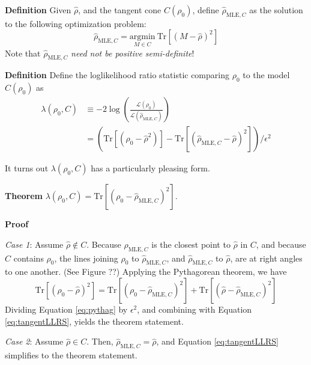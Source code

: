 \documentclass[aps,pra, twocolumn]{revtex4-1}
\newcommand{\rhohat}{\hat{\rho}}
\begin{document}
\textbf{Definition} Given $\hat{\rho}$, and the tangent cone $C(\rho_{0})$, define $\hat{\rho}_{\mathrm{MLE}, C}$ as the solution to the following optimization problem:
\begin{equation}
\hat{\rho}_{\mathrm{MLE}, C} = \underset{M \in C}{\text{argmin}}~\mathrm{Tr}[(M - \rhohat)^{2}]
\end{equation}
Note that $\hat{\rho}_{\mathrm{MLE}, C}$ \emph{need not be positive semi-definite}!

\textbf{Definition} Define the loglikelihood ratio statistic comparing $\rho_{0}$ to the model $C(\rho_{0})$ as 
\begin{align}
\nonumber\lambda(\rho_{0}, C) &\equiv -2 \log \left(\frac{\mathcal{L}(\rho_{0})}{\mathcal{L}(\hat{\rho}_{\mathrm{MLE}, C})}\right)\\
\label{eq:tangentLLRS}
& = (\mathrm{Tr}[(\rho_{0} - \rhohat^{2})] - \mathrm{Tr}[(\hat{\rho}_{\mathrm{MLE}, C} - \rhohat)^{2}])/\epsilon^{2}
\end{align}


It turns out $\lambda(\rho_{0}, C)$ has a particularly pleasing form.

\textbf{Theorem} $\lambda(\rho_{0}, C) = \mathrm{Tr}[(\rho_{0} - \hat{\rho}_{\mathrm{MLE}, C})^{2}]$.

\textbf{Proof}

\emph{Case 1}: Assume $\rhohat \not \in C$. Because $\hat{\rho}_{\mathrm{MLE}, C}$ is the closest point to $\rhohat$ in $C$, and because $C$ contains $\rho_{0}$, the lines joining $\rho_{0}$ to $\hat{\rho}_{\mathrm{MLE}, C}$, and $\hat{\rho}_{\mathrm{MLE}, C}$ to $\rhohat$, are at right angles to one another. (See Figure ??) Applying the Pythagorean theorem, we have
\begin{equation}
\label{eq:pythag}
\mathrm{Tr}[(\rho_{0} - \rhohat)^{2}] = \mathrm{Tr}[(\rho_{0} - \hat{\rho}_{\mathrm{MLE}, C})^{2}] + \mathrm{Tr}[(\rhohat - \hat{\rho}_{\mathrm{MLE}, C})^{2}]
\end{equation}
Dividing Equation \eqref{eq:pythag} by $\epsilon^{2}$, and combining with Equation \eqref{eq:tangentLLRS}, yields the theorem statement.

\emph{Case 2}: Assume $\rhohat \in C$. Then, $\hat{\rho}_{\mathrm{MLE}, C} = \rhohat$, and Equation \eqref{eq:tangentLLRS} simplifies to the theorem statement.
~\\~\\

\end{document}
